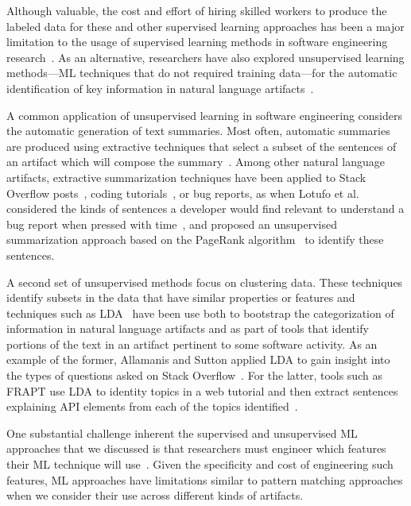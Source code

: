 Although valuable, the cost and effort of hiring skilled workers to produce 
the labeled data for these and other supervised learning approaches
has been a major limitation 
to the usage of supervised learning 
methods in software engineering research~\cite{Arpteg2018, ferreira2021}. As an alternative,
researchers have also explored 
 unsupervised learning methods---\acs{ML} techniques that do not required training data---for the automatic 
identification of 
key information in natural language artifacts~\cite{}.





A common application of unsupervised learning in software engineering
considers the automatic generation of text summaries.
Most often, automatic summaries are produced 
using extractive techniques that select a subset of 
the sentences of an artifact which will compose the summary~\cite{a}.
Among other natural language artifacts,
extractive summarization techniques
have been applied to Stack Overflow posts~\cite{a}, coding tutorials~\cite{a},
or bug reports, as
when Lotufo et al. 
considered the kinds of sentences a developer would find relevant 
to understand a bug report when pressed with time~\cite{Lotufo2012},
and proposed an unsupervised summarization approach 
based on the PageRank algorithm~\cite{Page1999}
to identify these sentences. 




A second set of unsupervised methods focus on clustering data.
These techniques identify 
subsets in the data that have similar properties or features 
and techniques such as \acf{LDA}~\cite{blei2003latent}  have been use both to 
bootstrap the categorization of information in 
natural language artifacts and as part of tools that identify 
portions of the text in an artifact pertinent to some software activity. 
As an example of the former, 
 Allamanis and Sutton
applied \acs{LDA}
to gain insight into the types of questions 
asked on Stack Overflow~\cite{Allamanis2013}.
For the latter, tools such as FRAPT
use \acs{LDA} to identity topics in a web tutorial
and then extract sentences explaining API elements from each of the topics identified~\cite{Jiang2017}.



One substantial challenge inherent the supervised and 
unsupervised \acs{ML} approaches that we discussed
is that researchers must engineer which 
features their \acs{ML} technique will use~\cite{ferreira2021}.
Given the specificity and cost of engineering such features, 
\acs{ML} approaches have limitations similar to pattern 
matching approaches when we consider their use across 
different kinds of artifacts.




